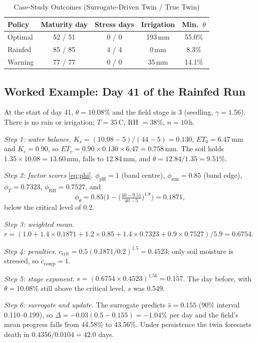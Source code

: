 \documentclass[conference]{IEEEtran}
\begin{document}
\begin{table}[t]
\centering
\caption{Case-Study Outcomes (Surrogate-Driven Twin / True Twin)}
\label{tab:case}
\footnotesize
\setlength{\tabcolsep}{3.5pt}
\begin{tabular}{@{}lcccc@{}}
\toprule
Policy & Maturity day & Stress days & Irrigation & Min.\ $\theta$ \\
\midrule
Optimal & 52 / 51 & 0 / 0 & 193\,mm & 55.0\% \\
Rainfed & 85 / 85 & 4 / 4 & 0\,mm & 8.3\% \\
Warning & 77 / 77 & 0 / 0 & 35\,mm & 14.1\% \\
\bottomrule
\end{tabular}
\end{table}

\subsection{Worked Example: Day 41 of the Rainfed Run}
At the start of day 41, $\theta = 10.08\%$ and the field stage is 3 (seedling,
$\gamma = 1.56$). There is no rain or irrigation; $T = 35$\,\textdegree C, RH $= 38\%$,
$n = 10$\,h.

\emph{Step 1: water balance.} $K_s = (10.08 - 5)/(44 - 5) = 0.130$, $ET_0 = 6.47$\,mm and
$K_c = 0.90$, so $ET_c = 0.90 \times 0.130 \times 6.47 = 0.758$\,mm. The soil holds
$1.35 \times 10.08 = 13.60$\,mm, falls to 12.84\,mm, and
$\theta = 12.84/1.35 = 9.51\%$.

\emph{Step 2: factor scores} \eqref{eq:phi}. $\phi_{\mathrm{pH}} = 1$ (band centre),
$\phi_{\mathrm{sun}} = 0.85$ (band edge), $\phi_T = 0.7323$, $\phi_{\mathrm{RH}} = 0.7527$, and
\[
\phi_\theta = 0.85\Big(1 - \big(\tfrac{40 - 9.51}{40 - 5}\big)^{1.8}\Big) = 0.1871,
\]
below the critical level of 0.2.

\emph{Step 3: weighted mean.}
$r = (1.0 + 1.4 \times 0.1871 + 1.2 \times 0.85 + 1.4 \times 0.7323 + 0.9 \times 0.7527)/5.9 = 0.6754$.

\emph{Step 4: penalties.} $c_{\mathrm{crit}} = 0.5(0.1871/0.2)^{1.5} = 0.4523$; only soil
moisture is stressed, so $c_{\mathrm{comp}} = 1$.

\emph{Step 5: stage exponent.} $s = (0.6754 \times 0.4523)^{1.56} = 0.157$. The day
before, with $\theta = 10.08\%$ still above the critical level, $s$ was 0.549.

\emph{Step 6: surrogate and update.} The surrogate predicts $\hat s = 0.155$ (90\% interval
0.110--0.199), so $\Delta = -0.03(0.5 - 0.155) = -1.04\%$ per day and the
field's mean progress falls from 44.58\% to 43.56\%. Under persistence the twin forecasts
death in $0.4356/0.0104 = 42.0$ days.
\end{document}
